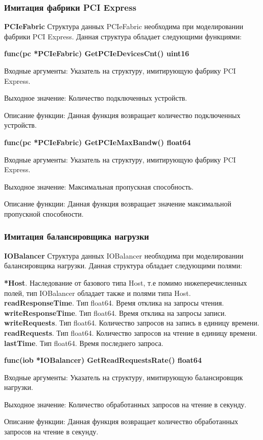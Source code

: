 \subsubsection{Имитация фабрики PCI Express}
\textbf{PCIeFabric}
Структура данных PCIeFabric необходима при моделировании фабрики PCI Express. Данная структура обладает следующими функциями:

\textbf{func(pc *PCIeFabric) GetPCIeDevicesCnt() uint16}

Входные аргументы: Указатель на структуру, имитирующую фабрику PCI Express.

Выходное значение: Количество подключенных устройств.

Описание функции: Данная функция возвращает количество подключенных устройств.


\textbf{func(pc *PCIeFabric) GetPCIeMaxBandw() float64}

Входные аргументы: Указатель на структуру, имитирующую фабрику PCI Express.

Выходное значение: Максимальная пропускная способность.

Описание функции: Данная функция возвращает значение максимальной пропускной способности.

\subsubsection{Имитация балансировщика нагрузки}
\textbf{IOBalancer}
Структура данных IOBalancer необходима при моделировании балансировщика нагрузки. Данная структура обладает следующими полями:

\textbf{	*Host}. Наследование от базового типа Host, т.е помимо нижеперечисленных полей, тип IOBalancer обладает также и полями типа Host. 
\textbf{	readResponseTime}. Тип float64. Время отклика на запросы чтения.
\textbf{	writeResponseTime}. Тип float64. Время отклика на запросы записи.
\textbf{	writeRequests}. Тип float64. Количество запросов на запись в единицу времени.
\textbf{	readRequests}. Тип  float64. Количество запросов на чтение в единицу времени.
\textbf{	lastTime}. Тип float64. Время последнего запроса. 


\textbf{func(iob *IOBalancer) GetReadRequestsRate() float64}

Входные аргументы: Указатель на структуру, имитирующую балансировщик нагрузки.

Выходное значение: Количество обработанных запросов на чтение в секунду.

Описание функции: Данная функция возвращает количество обработанных запросов на чтение в секунду.

